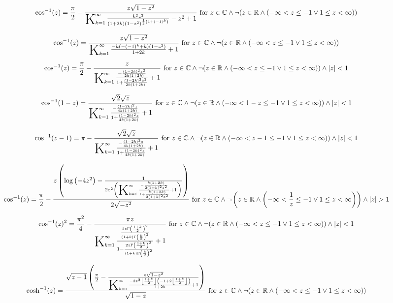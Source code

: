 \documentclass{article}
\newcommand{\bigK}{\mathop{\raisebox{-5pt}{\huge K}}}
\begin{document}
\[\cos ^{-1}(z)=\frac{\pi }{2}-\frac{z \sqrt{1-z^2}}{\bigK_{k=1}^{\infty}\frac{k^2 z^2}{(1+2 k) \left(1-z^2\right)^{\frac{1}{2} \left(1+(-1)^k\right)}}-z^2+1}\text{ for }z\in \mathbb{C}\land \neg (z\in \mathbb{R}\land (-\infty <z\leq -1\lor 1\leq z<\infty ))\] 

\[\cos ^{-1}(z)=\frac{z \sqrt{1-z^2}}{\bigK_{k=1}^{\infty}\frac{-k \left(-(-1)^k+k\right) \left(1-z^2\right)}{1+2 k}+1}\text{ for }z\in \mathbb{C}\land \neg (z\in \mathbb{R}\land (-\infty <z\leq -1\lor 1\leq z<\infty ))\] 

\[\cos ^{-1}(z)=\frac{\pi }{2}-\frac{z}{\bigK_{k=1}^{\infty}\frac{-\frac{(1-2 k)^2 z^2}{2 k (1+2 k)}}{1+\frac{(1-2 k)^2 z^2}{2 k (1+2 k)}}+1}\text{ for }z\in \mathbb{C}\land \neg (z\in \mathbb{R}\land (-\infty <z\leq -1\lor 1\leq z<\infty ))\land \left| z\right| <1\] 

\[\cos ^{-1}(1-z)=\frac{\sqrt{2} \sqrt{z}}{\bigK_{k=1}^{\infty}\frac{-\frac{(1-2 k)^2 z}{4 k (1+2 k)}}{1+\frac{(1-2 k)^2 z}{4 k (1+2 k)}}+1}\text{ for }z\in \mathbb{C}\land \neg (z\in \mathbb{R}\land (-\infty <1-z\leq -1\lor 1\leq z<\infty ))\land \left| z\right| <1\] 

\[\cos ^{-1}(z-1)=\pi -\frac{\sqrt{2} \sqrt{z}}{\bigK_{k=1}^{\infty}\frac{-\frac{(1-2 k)^2 z}{4 k (1+2 k)}}{1+\frac{(1-2 k)^2 z}{4 k (1+2 k)}}+1}\text{ for }z\in \mathbb{C}\land \neg (z\in \mathbb{R}\land (-\infty <z-1\leq -1\lor 1\leq z<\infty ))\land \left| z\right| <1\] 

\[\cos ^{-1}(z)=\frac{\pi }{2}-\frac{z \left(\log \left(-4 z^2\right)-\frac{1}{2 z^2 \left(\bigK_{k=1}^{\infty}\frac{-\frac{k (1+2 k)}{2 (1+k)^2 z^2}}{1+\frac{k (1+2 k)}{2 (1+k)^2 z^2}}+1\right)}\right)}{2 \sqrt{-z^2}}\text{ for }z\in \mathbb{C}\land \neg \left(z\in \mathbb{R}\land \left(-\infty <\frac{1}{z}\leq -1\lor 1\leq z<\infty \right)\right)\land \left| z\right| >1\] 

\[\cos ^{-1}(z)^2=\frac{\pi ^2}{4}-\frac{\pi  z}{\bigK_{k=1}^{\infty}\frac{\frac{2 z \Gamma \left(\frac{1+k}{2}\right)^2}{(1+k) \Gamma \left(\frac{k}{2}\right)^2}}{1-\frac{2 z \Gamma \left(\frac{1+k}{2}\right)^2}{(1+k) \Gamma \left(\frac{k}{2}\right)^2}}+1}\text{ for }z\in \mathbb{C}\land \neg (z\in \mathbb{R}\land (-\infty <z\leq -1\lor 1\leq z<\infty ))\land \left| z\right| <1\] 

\[\cosh ^{-1}(z)=\frac{\sqrt{z-1} \left(\frac{\pi }{2}-\frac{z \sqrt{1-z^2}}{\bigK_{k=1}^{\infty}\frac{-2 z^2 \left\lfloor \frac{1+k}{2}\right\rfloor  \left(-1+2 \left\lfloor \frac{1+k}{2}\right\rfloor \right)}{1+2 k}+1}\right)}{\sqrt{1-z}}\text{ for }z\in \mathbb{C}\land \neg (z\in \mathbb{R}\land (-\infty <z\leq -1\lor 1\leq z<\infty ))\] 
\end{document}
